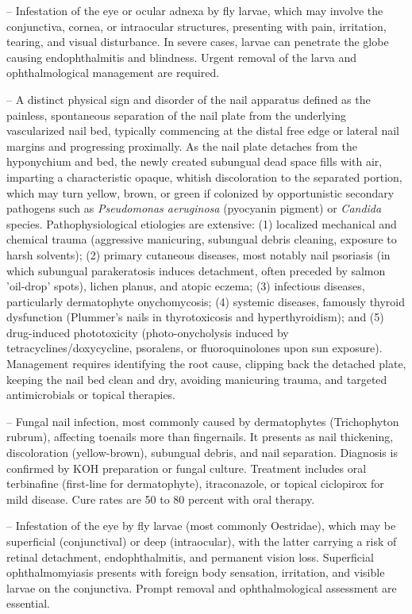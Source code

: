 -- Infestation of the eye or ocular adnexa by fly larvae, which may involve the conjunctiva, cornea, or intraocular structures, presenting with pain, irritation, tearing, and visual disturbance. In severe cases, larvae can penetrate the globe causing endophthalmitis and blindness. Urgent removal of the larva and ophthalmological management are required.

-- A distinct physical sign and disorder of the nail apparatus defined as the painless, spontaneous separation of the nail plate from the underlying vascularized nail bed, typically commencing at the distal free edge or lateral nail margins and progressing proximally. As the nail plate detaches from the hyponychium and bed, the newly created subungual dead space fills with air, imparting a characteristic opaque, whitish discoloration to the separated portion, which may turn yellow, brown, or green if colonized by opportunistic secondary pathogens such as \textit{Pseudomonas aeruginosa} (pyocyanin pigment) or \textit{Candida} species. Pathophysiological etiologies are extensive: (1) localized mechanical and chemical trauma (aggressive manicuring, subungual debris cleaning, exposure to harsh solvents); (2) primary cutaneous diseases, most notably nail psoriasis (in which subungual parakeratosis induces detachment, often preceded by salmon 'oil-drop' spots), lichen planus, and atopic eczema; (3) infectious diseases, particularly dermatophyte onychomycosis; (4) systemic diseases, famously thyroid dysfunction (Plummer's nails in thyrotoxicosis and hyperthyroidism); and (5) drug-induced phototoxicity (photo-onycholysis induced by tetracyclines/doxycycline, psoralens, or fluoroquinolones upon sun exposure). Management requires identifying the root cause, clipping back the detached plate, keeping the nail bed clean and dry, avoiding manicuring trauma, and targeted antimicrobials or topical therapies.

-- Fungal nail infection, most commonly caused by dermatophytes (Trichophyton rubrum), affecting toenails more than fingernails. It presents as nail thickening, discoloration (yellow-brown), subungual debris, and nail separation. Diagnosis is confirmed by KOH preparation or fungal culture. Treatment includes oral terbinafine (first-line for dermatophyte), itraconazole, or topical ciclopirox for mild disease. Cure rates are 50 to 80 percent with oral therapy.

-- Infestation of the eye by fly larvae (most commonly Oestridae), which may be superficial (conjunctival) or deep (intraocular), with the latter carrying a risk of retinal detachment, endophthalmitis, and permanent vision loss. Superficial ophthalmomyiasis presents with foreign body sensation, irritation, and visible larvae on the conjunctiva. Prompt removal and ophthalmological assessment are essential.

